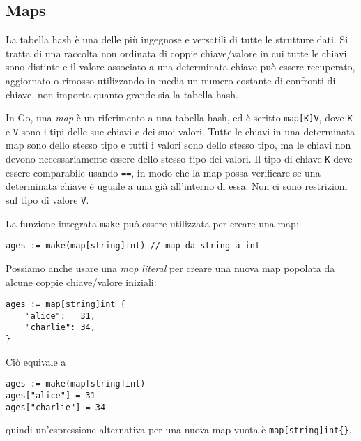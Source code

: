 \documentclass[../../thesis.tex]{subfiles}
\begin{document}
    \subsection{Maps}\label{subsec:maps}
    La tabella hash è una delle più ingegnose e versatili di tutte le strutture dati.
    Si tratta di una raccolta non ordinata di coppie chiave/valore in cui tutte le chiavi sono distinte e il valore associato a una determinata chiave può essere recuperato, aggiornato o rimosso utilizzando in media un numero costante di confronti di chiave, non importa quanto grande sia la tabella hash.
    \hfill \vspace{12pt}

    In Go, una \textit{map} è un riferimento a una tabella hash, ed è scritto \verb"map[K]V", dove \verb"K" e \verb"V" sono i tipi delle sue chiavi e dei suoi valori.
    Tutte le chiavi in una determinata map sono dello stesso tipo e tutti i valori sono dello stesso tipo, ma le chiavi non devono necessariamente essere dello stesso tipo dei valori.
    Il tipo di chiave \verb"K" deve essere comparabile usando \verb"==", in modo che la map possa verificare se una determinata chiave è uguale a una già all'interno di essa.
    Non ci sono restrizioni sul tipo di valore \verb"V".
    \hfill \vspace{12pt}

    La funzione integrata \verb"make" può essere utilizzata per creare una map:
    \begin{lstlisting}[label = {lst:lstlisting3-3.1}]
ages := make(map[string]int) // map da string a int
    \end{lstlisting}
    \clearpage
    \newpage
    Possiamo anche usare una \textit{map literal} per creare una nuova map popolata da alcune coppie chiave/valore iniziali:
    \begin{lstlisting}[frame = single, label = {lst:lstlisting3-3.2}]
ages := map[string]int {
    "alice":   31,
    "charlie": 34,
}
    \end{lstlisting}
    Ciò equivale a
    \begin{lstlisting}[frame = single, label = {lst:lstlisting3-3.3}]
ages := make(map[string]int)
ages["alice"] = 31
ages["charlie"] = 34
    \end{lstlisting}
    quindi un'espressione alternativa per una nuova map vuota è \verb"map[string]int{}".
    \hfill \vspace{12pt}
\end{document}
